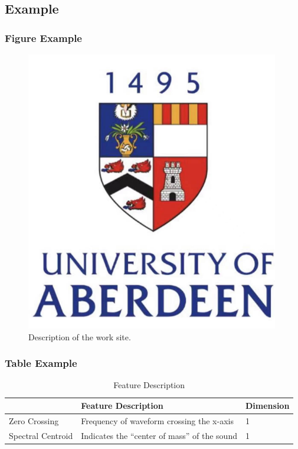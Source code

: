 \documentclass[UTF8,AutoFakeBold=1,AutoFakeSlant,zihao=-4]{SCNU}
\begin{document}
\subsection{Example}

\subsubsection{Figure Example}
\begin{figure}[ht]
    \centering
    \includegraphics[scale=0.64]{figures/abd.png}
    \caption{Description of the work site.}
    \label{fig:example}
\end{figure}

\subsubsection{Table Example}
\begin{table}[ht]
    \centering
    \caption{ Feature Description}
    \begin{tabular}{lll}
    \toprule
                     & Feature Description & Dimension \\ \midrule
    Zero Crossing  & Frequency of waveform crossing the x-axis  & 1 \\
    Spectral Centroid & Indicates the “center of mass” of the sound & 1 \\ \bottomrule
    \end{tabular}
    \label{tab:example}
\end{table}
\end{document}
